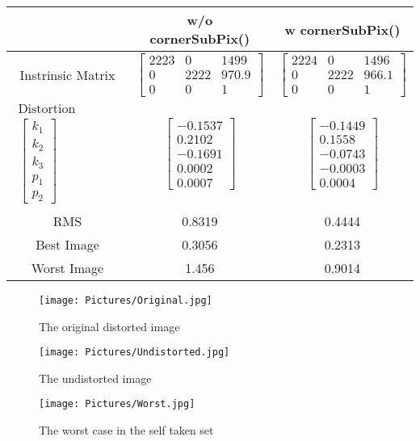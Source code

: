 \documentclass[11pt,a4paper]{article}
\newcommand{\cc}{\fontfamily{txtt}\selectfont}
\begin{document}
\begin{center}
\begin{tabular}{|c | c c|}
\hline
 & w/o {\cc cornerSubPix()} & w {\cc cornerSubPix()}\\
\hline
\hline
     Instrinsic Matrix & 
     $\begin{bmatrix}2223& 0& 1499\\
 0& 2222& 970.9\\
 0& 0& 1\end{bmatrix}$ & 
      $\begin{bmatrix} 2224& 0& 1496\\
 0& 2222& 966.1\\
 0& 0& 1\end{bmatrix}$ \\
     \hline
     $\begin{matrix}
     \text{Distortion Coefficients}\\ \begin{bmatrix}k_1\\ k_2\\ k_3\\ p_1\\ p_2 \end{bmatrix} 
     \end{matrix}$ & 
    $\begin{bmatrix}-0.1537\\ 0.2102\\ -0.1691\\ 0.0002\\ 0.0007\end{bmatrix}$ &
     $\begin{bmatrix} -0.1449\\ 0.1558\\ -0.0743\\ -0.0003\\0.0004 \end{bmatrix}$ \\
     \hline
     RMS & 0.8319& 0.4444\\
     \hline
     Best Image &   0.3056 & 0.2313\\
     \hline
     Worst Image &  1.456& 0.9014\\
     \hline
\end{tabular}    
\begin{figure}[ht]
  \texttt{[image: Pictures/Original.jpg]}
  \caption{The original distorted image}
\end{figure}  
\begin{figure}[ht]
  \texttt{[image: Pictures/Undistorted.jpg]}
  \caption{The undistorted image}
\end{figure}
\begin{figure}[ht]
  \texttt{[image: Pictures/Worst.jpg]}
  \caption{The worst case in the self taken set}
\end{figure}
\end{center}
\end{document}
